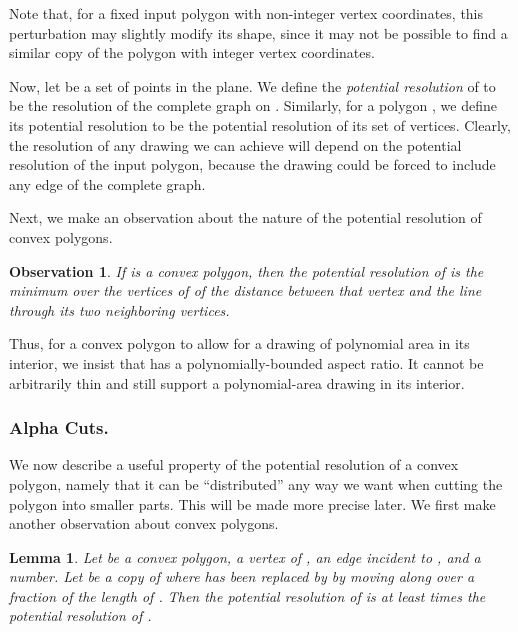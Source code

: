 \documentclass[11pt]{article}
\newtheorem {observation} {Observation}
\newtheorem {lemma} {Lemma}
\renewcommand{\subsection}[1]{\subsubsection{#1.}}
\begin{document}
    Note that, for a fixed input polygon with non-integer vertex coordinates, this
    perturbation may slightly modify its shape, since it may not be possible to
    find a similar copy of the polygon with integer vertex coordinates.

    Now, let  be a set of points in the plane. We define the \emph {potential
    resolution} of  to be the resolution of the complete graph on .
    Similarly, for a polygon , we define its potential resolution to be the
    potential resolution of its set of vertices.
    Clearly, the resolution of any drawing we can achieve will depend on the
    potential resolution of the input polygon, because the drawing could be
    forced to include any edge of the complete   graph.

    Next, we make an observation about the nature of the potential resolution of
    convex polygons.


    \begin {observation} \label {obs:convex-easier}
      If  is a convex polygon, then the potential resolution of  is the
      minimum over the vertices of  of the distance between that vertex and the
      line through its two neighboring vertices.
    \end {observation}



    Thus, for a convex polygon  to allow for a drawing of polynomial
    area in its interior, we insist that
     has a polynomially-bounded aspect ratio. It cannot be
    arbitrarily thin and still support a polynomial-area drawing in its
    interior.

  \subsection {Alpha Cuts}

    We now describe a useful property of the potential resolution of a convex
    polygon, namely that it can be ``distributed'' any way we want when cutting 
    the polygon into smaller parts.
    This will be made more precise later.
    We first make another observation about convex polygons.
    
    \begin {lemma} \label {lem:move-vertex}
      Let  be a convex polygon,  a vertex of ,  an edge incident to , and  a number. Let  be a copy of  where 
      has been replaced by  by moving  along  over a fraction 
      of the length of . Then the potential resolution of  is at least  times the potential resolution of .
    \end {lemma}
\end{document}
